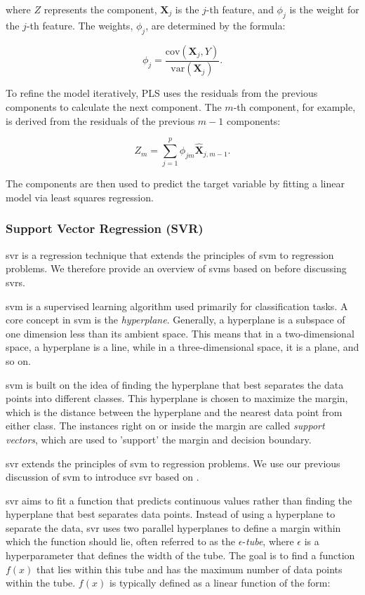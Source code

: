 where $Z$ represents the component, $\mathbf{X}_j$ is the $j$-th feature, and $\phi_j$ is the weight for the $j$-th feature.
The weights, $\phi_j$, are determined by the formula:

$$
    \phi_j = \frac{\text{cov}(\mathbf{X}_j, Y)}{\text{var}(\mathbf{X}_j)}.
$$

To refine the model iteratively, PLS uses the residuals from the previous components to calculate the next component.
The $m$-th component, for example, is derived from the residuals of the previous $m-1$ components:

$$
    Z_m = \sum_{j=1}^{p} \phi_{jm} \hat{\mathbf{X}}_{j, m-1}.
$$

The components are then used to predict the target variable by fitting a linear model via least squares regression.

\subsubsection{Support Vector Regression (SVR)}
\gls{svr} is a regression technique that extends the principles of \gls{svm} to regression problems.
We therefore provide an overview of \gls{svm}s based on \citet{James2023AnIS} before discussing \gls{svr}s.

\gls{svm} is a supervised learning algorithm used primarily for classification tasks.
A core concept in \gls{svm} is the \textit{hyperplane}.
Generally, a hyperplane is a subspace of one dimension less than its ambient space.
This means that in a two-dimensional space, a hyperplane is a line, while in a three-dimensional space, it is a plane, and so on.

\gls{svm} is built on the idea of finding the hyperplane that best separates the data points into different classes.
This hyperplane is chosen to maximize the margin, which is the distance between the hyperplane and the nearest data point from either class.
The instances right on or inside the margin are called \textit{support vectors}, which are used to 'support' the margin and decision boundary.

\gls{svr} extends the principles of \gls{svm} to regression problems.
We use our previous discussion of \gls{svm} to introduce \gls{svr} based on \citet{druckerSVR}.

\gls{svr} aims to fit a function that predicts continuous values rather than finding the hyperplane that best separates data points.
Instead of using a hyperplane to separate the data, \gls{svr} uses two parallel hyperplanes to define a margin within which the function should lie, often referred to as the $\epsilon$-\textit{tube}, where $\epsilon$ is a hyperparameter that defines the width of the tube.
The goal is to find a function $f(x)$ that lies within this tube and has the maximum number of data points within the tube.
$f(x)$ is typically defined as a linear function of the form:

